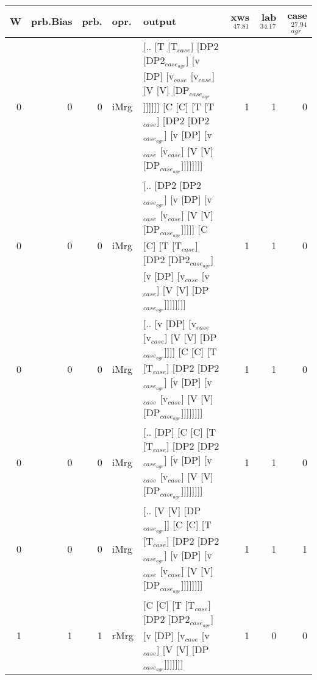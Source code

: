 \begin{tabularx}{\linewidth}{rrrlXrrr}
\hline
   W &   prb.Bias &   prb. & opr.   & output                                                                                                                                                                             &   xws$^{47.81}$ &   lab$^{34.17}$ &   case$_{agr}^{27.94}$ \\
\hline
   0 &       0 &   0 & iMrg & [.. [T [T$_{case}$] [DP2 [DP2$_{case_{agr}}$] [v [DP] [v$_{case}$ [v$_{case}$] [V [V] [DP$_{case_{agr}}$]]]]]] [C [C] [T [T$_{case}$] [DP2 [DP2$_{case_{agr}}$] [v [DP] [v$_{case}$ [v$_{case}$] [V [V] [DP$_{case_{agr}}$]]]]]]]] &             1 &             1 &                  0 \\
   0 &       0 &   0 & iMrg & [.. [DP2 [DP2$_{case_{agr}}$] [v [DP] [v$_{case}$ [v$_{case}$] [V [V] [DP$_{case_{agr}}$]]]]] [C [C] [T [T$_{case}$] [DP2 [DP2$_{case_{agr}}$] [v [DP] [v$_{case}$ [v$_{case}$] [V [V] [DP$_{case_{agr}}$]]]]]]]]              &             1 &             1 &                  0 \\
   0 &       0 &   0 & iMrg & [.. [v [DP] [v$_{case}$ [v$_{case}$] [V [V] [DP$_{case_{agr}}$]]]] [C [C] [T [T$_{case}$] [DP2 [DP2$_{case_{agr}}$] [v [DP] [v$_{case}$ [v$_{case}$] [V [V] [DP$_{case_{agr}}$]]]]]]]]                                   &             1 &             1 &                  0 \\
   0 &       0 &   0 & iMrg & [.. [DP] [C [C] [T [T$_{case}$] [DP2 [DP2$_{case_{agr}}$] [v [DP] [v$_{case}$ [v$_{case}$] [V [V] [DP$_{case_{agr}}$]]]]]]]]                                                                               &             1 &             1 &                  0 \\
   0 &       0 &   0 & iMrg & [.. [V [V] [DP$_{case_{agr}}$]] [C [C] [T [T$_{case}$] [DP2 [DP2$_{case_{agr}}$] [v [DP] [v$_{case}$ [v$_{case}$] [V [V] [DP$_{case_{agr}}$]]]]]]]]                                                              &             1 &             1 &                  1 \\
   1 &       1 &   1 & rMrg & [C [C] [T [T$_{case}$] [DP2 [DP2$_{case_{agr}}$] [v [DP] [v$_{case}$ [v$_{case}$] [V [V] [DP$_{case_{agr}}$]]]]]]]                                                                                         &             1 &             0 &                  0 \\
\hline
\end{tabularx}\endgroup\\
